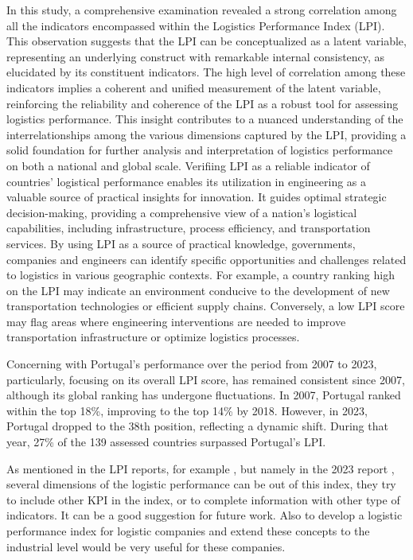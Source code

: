 \documentclass[sigconf]{acmart}
\begin{document}
In this study, a comprehensive examination revealed a strong correlation among all the indicators encompassed within the Logistics Performance Index (LPI). This observation suggests that the LPI can be conceptualized as a latent variable, representing an underlying construct with remarkable internal consistency, as elucidated by its constituent indicators. The high level of correlation among these indicators implies a coherent and unified measurement of the latent variable, reinforcing the reliability and coherence of the LPI as a robust tool for assessing logistics performance. This insight contributes to a nuanced understanding of the interrelationships among the various dimensions captured by the LPI, providing a solid foundation for further analysis and interpretation of logistics performance on both a national and global scale.
Verifiing LPI as a reliable indicator of countries' logistical performance enables its utilization in engineering as a valuable source of practical insights for innovation. It guides optimal strategic decision-making, providing a comprehensive view of a nation's logistical capabilities, including infrastructure, process efficiency, and transportation services. By using LPI as a source of practical knowledge, governments, companies and engineers can identify specific opportunities and challenges related to logistics in various geographic contexts. For example, a country ranking high on the LPI may indicate an environment conducive to the development of new transportation technologies or efficient supply chains. Conversely, a low LPI score may flag areas where engineering interventions are needed to improve transportation infrastructure or optimize logistics processes.

Concerning with Portugal's performance over the period from 2007 to 2023, particularly, focusing on its overall LPI score, has remained consistent since 2007, although its global ranking has undergone fluctuations. In 2007, Portugal ranked within the top 18\%, improving to the top 14\% by 2018. However, in 2023, Portugal dropped to the 38th position, reflecting a dynamic shift. During that year, 27\% of the 139 assessed countries surpassed Portugal's LPI. 

As mentioned in the LPI reports, for example \cite{WBreport2016,WBreport2018}, but namely in the 2023 report \cite{WBreport2023}, several dimensions of the logistic performance can be out of this index, they try to include other KPI in the index, or to complete information with other type of indicators. It can be a good suggestion for future work. Also to develop a logistic performance index for logistic companies and extend these concepts to the industrial level would be very useful for these companies.
\end{document}
